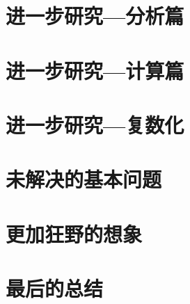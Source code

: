 \documentclass[a4paper,12pt]{book}
\numberwithin{problem}{section}
\numberwithin{definition}{section}
\numberwithin{lemma}{section}
\numberwithin{proposition}{section}
\numberwithin{theorem}{section}
\numberwithin{grammar}{section}
\numberwithin{program}{section}
\numberwithin{convention}{section}
\numberwithin{corollary}{section}
\begin{document}
\newpage

\chapter{进一步研究—分析篇}

\newpage

\chapter{进一步研究—计算篇}
\label{chap:computation}

\newpage

\chapter{进一步研究—复数化}

\newpage

\chapter{未解决的基本问题}

\newpage

\chapter{更加狂野的想象}

\newpage

\chapter{最后的总结}
\end{document}
